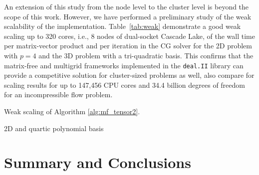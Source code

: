 \documentclass[AMA,STIX1COL]{WileyNJD-v2}
\begin{document}
An extension of this study from the node level to the cluster level is beyond the scope of this work.
However, we have performed a preliminary study of the weak scalability of the implementation.
Table~\ref{tab:weak} demonstrate a good weak scaling up to 320 cores, i.e., 8 nodes of dual-socket Cascade Lake,
of the wall time per matrix-vector product and per iteration in the CG solver for the 2D problem with $p=4$ and the 3D problem with a tri-quadratic basis.
This confirms that the matrix-free and multigrid frameworks implemented in the \texttt{deal.II} library can provide a competitive solution for cluster-sized problems as well,
also compare \cite[Figure 7]{Krank2017} for scaling results for up to 147,456 CPU cores and 34.4 billion degrees of freedom for an incompressible flow problem.

\begin{table}[!htb]
  \centering
  \caption{Weak scaling of Algorithm \ref{alg:mf_tensor2}.}
  \label{tab:weak}
  \begin{subtable}{.49\linewidth}
  \centering
  \caption{2D and quartic polynomial basis}
  \end{subtable}
  \begin{subtable}{.49\linewidth}
  \centering
  \caption{3D and quadratic polynomial basis}
  \end{subtable}
\end{table}

\section{Summary and Conclusions}
\label{sec:summary}
\end{document}
